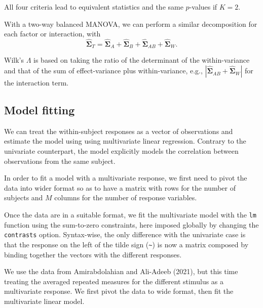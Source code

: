 \documentclass[
  11pt,
  letterpaper,
]{scrbook}
\theoremstyle{definition}
\theoremstyle{remark}
\begin{document}
All four criteria lead to equivalent statistics and the same
\(p\)-values if \(K=2\).

With a two-way balanced MANOVA, we can perform a similar decomposition
for each factor or interaction, with
\[\widehat{\boldsymbol{\Sigma}}_T = \widehat{\boldsymbol{\Sigma}}_A + \widehat{\boldsymbol{\Sigma}}_B + \widehat{\boldsymbol{\Sigma}}_{AB} + \widehat{\boldsymbol{\Sigma}}_W.\]

Wilk's \(\Lambda\) is based on taking the ratio of the determinant of
the within-variance and that of the sum of effect-variance plus
within-variance, e.g.,
\(|\widehat{\boldsymbol{\Sigma}}_{AB} + \widehat{\boldsymbol{\Sigma}}_W|\)
for the interaction term.

\hypertarget{model-fitting}{%
\subsection{Model fitting}\label{model-fitting}}

We can treat the within-subject responses as a vector of observations
and estimate the model using using multivariate linear regression.
Contrary to the univariate counterpart, the model explicitly models the
correlation between observations from the same subject.

In order to fit a model with a multivariate response, we first need to
pivot the data into wider format so as to have a matrix with rows for
the number of subjects and \(M\) columns for the number of response
variables.

Once the data are in a suitable format, we fit the multivariate model
with the \texttt{lm} function using the sum-to-zero constraints, here
imposed globally by changing the \texttt{contrasts} option. Syntax-wise,
the only difference with the univariate case is that the response on the
left of the tilde sign (\texttt{\textasciitilde{}}) is now a matrix
composed by binding together the vectors with the different responses.

We use the data from Amirabdolahian and Ali-Adeeb (2021), but this time
treating the averaged repeated measures for the different stimulus as a
multivariate response. We first pivot the data to wide format, then fit
the multivariate linear model.
\end{document}
